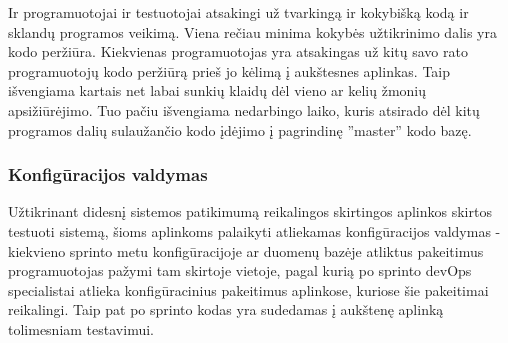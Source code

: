 \documentclass{VUMIFPSkursinis}
\begin{document}
	\par Ir programuotojai ir testuotojai atsakingi už tvarkingą ir kokybišką kodą ir sklandų programos veikimą. Viena rečiau minima kokybės užtikrinimo dalis yra kodo peržiūra. Kiekvienas programuotojas yra atsakingas už kitų savo rato programuotojų kodo peržiūrą prieš jo kėlimą į aukštesnes aplinkas. Taip išvengiama kartais net labai sunkių klaidų dėl vieno ar kelių žmonių apsižiūrėjimo. Tuo pačiu išvengiama nedarbingo laiko, kuris atsirado dėl kitų programos dalių sulaužančio kodo įdėjimo į pagrindinę ''master'' kodo bazę.
	\subsubsection{Konfigūracijos valdymas}
	Užtikrinant didesnį sistemos patikimumą reikalingos skirtingos aplinkos skirtos testuoti sistemą, šioms aplinkoms palaikyti atliekamas konfigūracijos valdymas - kiekvieno sprinto metu konfigūracijoje ar duomenų bazėje atliktus pakeitimus programuotojas pažymi tam skirtoje vietoje, pagal kurią po sprinto devOps specialistai atlieka konfigūracinius pakeitimus aplinkose, kuriose šie pakeitimai reikalingi. Taip pat po sprinto kodas yra sudedamas į aukštenę aplinką tolimesniam testavimui.
\end{document}
